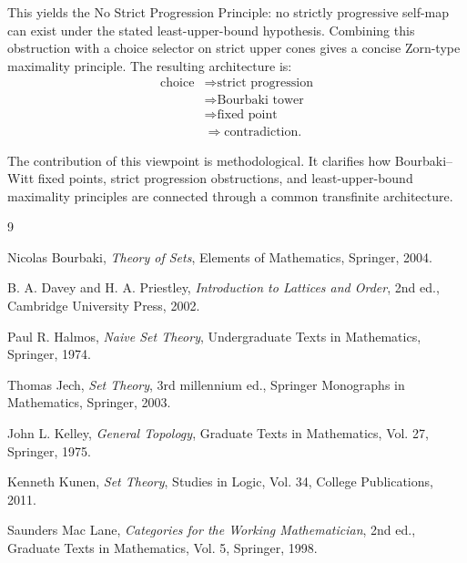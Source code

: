 \documentclass[11pt]{article}
\theoremstyle{definition}
\theoremstyle{remark}
\begin{document}
This yields the No Strict Progression Principle: no strictly progressive self-map can exist
under the stated least-upper-bound hypothesis. Combining this obstruction with a choice
selector on strict upper cones gives a concise Zorn-type maximality principle. The
resulting architecture is:
\[
\begin{aligned}
\text{choice}
&\Longrightarrow
\text{strict progression} \\
&\Longrightarrow
\text{Bourbaki tower} \\
&\Longrightarrow
\text{fixed point} \\
&\Longrightarrow
\text{contradiction}.
\end{aligned}
\]

The contribution of this viewpoint is methodological. It clarifies how Bourbaki--Witt
fixed points, strict progression obstructions, and least-upper-bound maximality principles
are connected through a common transfinite architecture.

\begin{thebibliography}{9}

Nicolas Bourbaki,
\emph{Theory of Sets},
Elements of Mathematics,
Springer, 2004.

B. A. Davey and H. A. Priestley,
\emph{Introduction to Lattices and Order},
2nd ed.,
Cambridge University Press, 2002.

Paul R. Halmos,
\emph{Naive Set Theory},
Undergraduate Texts in Mathematics,
Springer, 1974.

Thomas Jech,
\emph{Set Theory},
3rd millennium ed.,
Springer Monographs in Mathematics,
Springer, 2003.

John L. Kelley,
\emph{General Topology},
Graduate Texts in Mathematics, Vol. 27,
Springer, 1975.

Kenneth Kunen,
\emph{Set Theory},
Studies in Logic, Vol. 34,
College Publications, 2011.

Saunders Mac Lane,
\emph{Categories for the Working Mathematician},
2nd ed.,
Graduate Texts in Mathematics, Vol. 5,
Springer, 1998.

\end{thebibliography}
\end{document}
